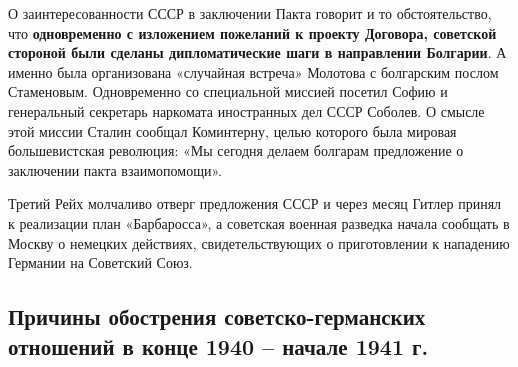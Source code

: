 \documentclass{article}
\begin{document}
О заинтересованности СССР в заключении Пакта говорит и то обстоятельство, что \textbf{одновременно с изложением пожеланий к проекту Договора, советской стороной были сделаны дипломатические шаги в направлении Болгарии}. А именно была организована «случайная встреча» Молотова с болгарским послом Стаменовым. Одновременно со специальной миссией посетил Софию и генеральный секретарь наркомата иностранных дел СССР Соболев. О смысле этой миссии Сталин сообщал Коминтерну, целью которого была мировая большевистская революция: «Мы сегодня делаем болгарам предложение о заключении пакта взаимопомощи».

\hfill

Третий Рейх молчаливо отверг предложения СССР и через месяц Гитлер принял к реализации план «Барбаросса», а советская военная разведка начала сообщать в Москву о немецких действиях, свидетельствующих о приготовлении к нападению Германии на Советский Союз. 

\pagebreak
\subsection{Причины обострения советско-германских отношений в конце 1940 – начале 1941 г.}
\end{document}
